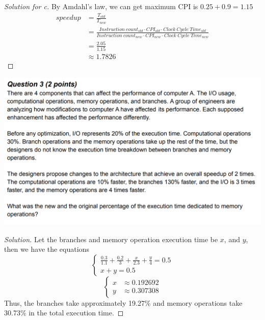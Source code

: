 \documentclass[12pt]{article}
\begin{document}
\begin{proof}[Solution for c]
	By Amdahl's law, we can get maximum CPI is $0.25+0.9=1.15$
	\begin{align*}
		speedup&=\frac{T_{old}}{T_{new}}\\
		&=\frac{Instruction\ count_{old} \cdot CPI_{old} \cdot Clock\ Cycle\ Time_{old}}{Instruction\ count_{new} \cdot CPI_{new} \cdot Clock\ Cycle\ Time_{new}}\\
		&=\frac{2.05}{1.15}\\
		&\approx1.7826
	\end{align*}
\end{proof}

\includegraphics[scale=0.36]{3.png}
\begin{proof}[Solution]
	Let the branches and memory operation execution time be $x$, and $y$, then we have the equations
	\begin{equation}
		\left\{
		\begin{aligned} 
			\frac{0.3}{1.1}+\frac{0.2}{3}+\frac{x}{2.3}+\frac{y}{4}=0.5\\
			x+y=0.5
		\end{aligned}
		\right.
	\end{equation}
	\begin{equation}
	\left\{
	\begin{aligned} 
		x&\approx0.192692\\
		y&\approx0.307308
	\end{aligned}
	\right.
\end{equation}
Thus, the branches take approximately 19.27\% and memory operations take 30.73\% in the total execution time. 
\end{proof}
\end{document}
